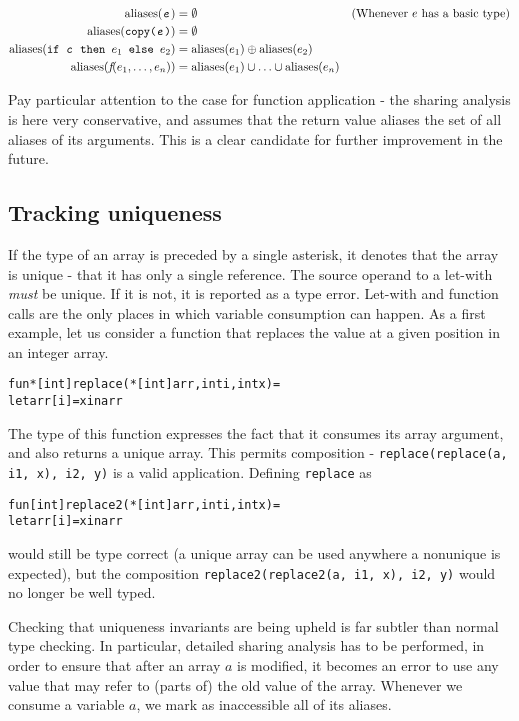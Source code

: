 \documentclass[oneside]{memoir}
\newcommand\aliases[1]{\textrm{aliases}(#1)}
\begin{document}
\begin{align*}
  \aliases{\texttt{\textit{e}}} &= \emptyset & (\text{Whenever $e$ has a basic type}) \\
  \aliases{\texttt{copy(\textit{e})}} &= \emptyset \\
  \aliases{\texttt{if \textit{c} then ${e}_{1}$ else ${e}_{2}$}} &= \aliases{e_{1}} \oplus \aliases{e_{2}} \\
  \aliases{\textit{f}(e_{1}, \ldots, e_{n})} &= \aliases{e_{1}} \cup \ldots \cup \aliases{e_{n}}
\end{align*}

Pay particular attention to the case for function application - the
sharing analysis is here very conservative, and assumes that the
return value aliases the set of all aliases of its arguments.  This is
a clear candidate for further improvement in the future.

\subsection{Tracking uniqueness}
\label{subsec:l0-tracking-uniqueness}

If the type of an array is preceded by a single asterisk, it denotes
that the array is unique - that it has only a single reference.  The
source operand to a let-with \textit{must} be unique.  If it is not,
it is reported as a type error.  Let-with and function calls are the
only places in which variable consumption can happen.  As a first
example, let us consider a function that replaces the value at a given
position in an integer array.

\begin{alltt}
  fun *[int] replace(*[int] arr, int i, int x) =
    let arr[i] = x in arr
\end{alltt}

The type of this function expresses the fact that it consumes its
array argument, and also returns a unique array.  This permits
composition - \texttt{replace(replace(a, i1, x), i2, y)} is a valid
application.  Defining \texttt{replace} as
\begin{alltt}
  fun [int] replace2(*[int] arr, int i, int x) =
    let arr[i] = x in arr
\end{alltt}
would still be type correct (a unique array can be used anywhere a
nonunique is expected), but the composition
\texttt{replace2(replace2(a, i1, x), i2, y)} would no longer be well
typed.

Checking that uniqueness invariants are being upheld is far subtler
than normal type checking.  In particular, detailed sharing analysis
has to be performed, in order to ensure that after an array $a$ is
modified, it becomes an error to use any value that may refer to
(parts of) the old value of the array.  Whenever we consume a variable
$a$, we mark as inaccessible all of its aliases.
\end{document}
